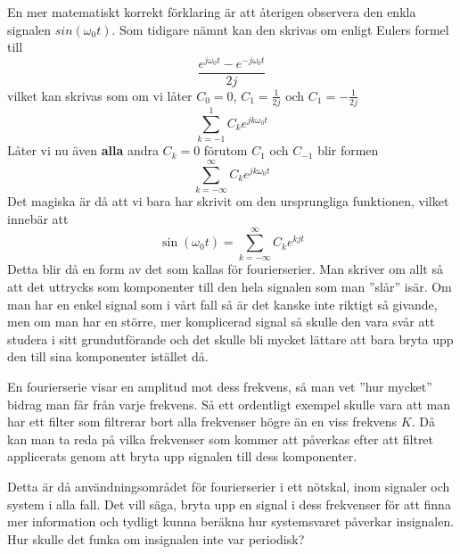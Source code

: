 \documentclass{article}
\begin{document}
En mer matematiskt korrekt förklaring är att återigen observera den enkla signalen $sin(\omega_0 t)$. Som tidigare nämnt kan den skrivas om enligt Eulers formel till
\[ \frac{e^{j \omega_0 t} - e^{-j \omega_0 t}}{2j}\]
vilket kan skrivas som om vi låter $C_0=0$, $C_{1}=\frac{1}{2j}$ och $C_{1}=-\frac{1}{2j}$
\[ \sum_{k=-1}^1 C_k e^{j k \omega_0 t} \]
Låter vi nu även \textbf{alla} andra $C_k = 0$ förutom  $C_1$ och $C_{-1}$ blir formen
\[ \sum_{k=-\infty}^{\infty} C_k e^{j k \omega_0 t} \]
Det magiska är då att vi bara har skrivit om den ursprungliga funktionen, vilket innebär att
\[ \sin(\omega_0 t) = \sum_{k=-\infty}^{\infty} C_k e^{k j t} \]
Detta blir då en form av det som kallas för fourierserier. Man skriver om allt så att det uttrycks som komponenter till den hela signalen som man ''slår'' isär. Om man har en enkel signal som i vårt fall så är det kanske inte riktigt så givande, men om man har en större, mer komplicerad signal så skulle den vara svår att studera i sitt grundutförande och det skulle bli mycket lättare att bara bryta upp den till sina komponenter istället då.

En fourierserie visar en amplitud mot dess frekvens, så man vet ''hur mycket'' bidrag man får från varje frekvens. Så ett ordentligt exempel skulle vara att man har ett filter som filtrerar bort alla frekvenser högre än en viss frekvens $K$. %
Då kan man ta reda på vilka frekvenser som kommer att påverkas efter att filtret applicerats genom att bryta upp signalen till dess komponenter.

Detta är då användningsområdet för fourierserier i ett nötskal, inom signaler och system i alla fall. Det vill säga, bryta upp en signal i dess frekvenser för att finna mer information och tydligt kunna beräkna hur systemsvaret påverkar insignalen. Hur skulle det funka om insignalen inte var periodisk?
\end{document}

